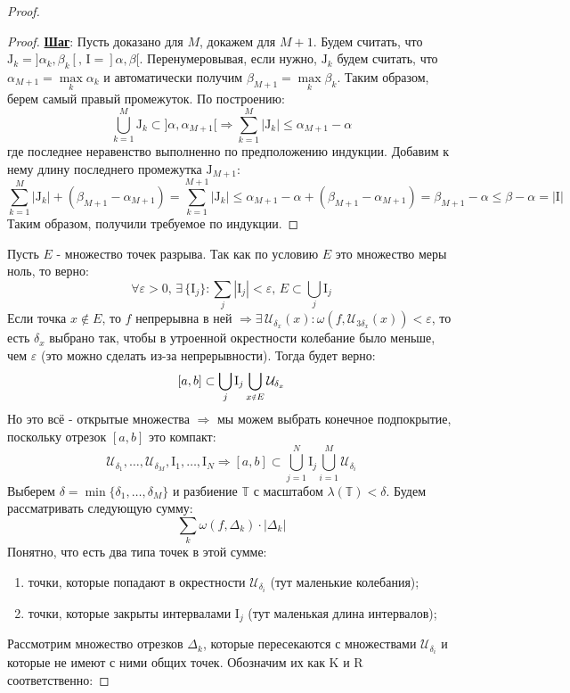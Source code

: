 \documentclass[12pt]{article}
\newcommand{\MTB}{\mathbb{T}}
\newcommand{\MI}{\mathrm{I}}
\newcommand{\MJ}{\mathrm{J}}
\newcommand{\MU}{\mathcal{U}}
\newcommand{\VE}{\varepsilon}
\theoremstyle{definition}
\newcommand{\smallerrel}[1]{\mathrel{\mathpalette\smallerrelaux{#1}}}
\newcommand{\smallerrelaux}[2]{\raisebox{.1ex}{\scalebox{.75}{$#1#2$}}}
\newcommand{\smallnotin}{\smallerrel{\notin}}
\begin{document}
\begin{proof}
\begin{proof}
		\textbf{\uline{Шаг}}: Пусть доказано для $M$, докажем для $M+1$. Будем считать, что $\MJ_k = ]\alpha_k, \beta_k[, \, \MI = ]\alpha,\beta[$. Перенумеровывая, если нужно, $\MJ_k$ будем считать, что $\alpha_{M+1} = \max\limits_{k}\alpha_k$ и автоматически получим $\beta_{M+1} = \max\limits_{k}\beta_k$. Таким образом, берем самый правый промежуток. По построению: 
		$$
			\displaystyle \bigcup\limits_{k = 1}^M \MJ_k \subset ]\alpha, \alpha_{M+1}[ \Rightarrow\sum\limits_{k = 1}^M |\MJ_k| \leq \alpha_{M+1} - \alpha
		$$
		где последнее неравенство выполненно по предположению индукции. Добавим к нему длину последнего промежутка $\MJ_{M+1}$:
		$$
			\sum\limits_{k = 1}^M |\MJ_k| + (\beta_{M+1} - \alpha_{M+1}) = \sum\limits_{k = 1}^{M+1} |\MJ_k| \leq \alpha_{M+1} - \alpha + (\beta_{M+1} - \alpha_{M+1}) = \beta_{M+1} - \alpha \leq \beta - \alpha = |\MI|
		$$
		Таким образом, получили требуемое по индукции.
	\end{proof}
	Пусть $E$ - множество точек разрыва. Так как по условию $E$ это множество меры ноль, то верно:
	$$
		\forall \VE > 0, \, \exists \, \{\MI_j \}\colon \sum\limits_{j}|\MI_j| < \VE, \, E \subset \bigcup\limits_j \MI_j
	$$
	Если точка $x \notin E$, то $f$ непрерывна в ней $\Rightarrow \exists \, \MU_{\delta_x}(x) \colon \omega\left(f,\MU_{3\delta_x}(x)\right) < \VE$, то есть $\delta_x$ выбрано так, чтобы в утроенной окрестности колебание было меньше, чем $\VE$ (это можно сделать из-за непрерывности). Тогда будет верно:
	$$
		[a,b] \subset \bigcup\limits_j \MI_j \bigcup\limits_{x \smallnotin E} \MU_{\delta_x}
	$$
	Но это всё - открытые множества $\Rightarrow$ мы можем выбрать конечное подпокрытие, поскольку отрезок $[a,b]$ это компакт:
	$$
		\MU_{\delta_1}, \dotsc, \MU_{\delta_M}, \MI_1, \dotsc , \MI_N \Rightarrow [a,b] \subset \bigcup\limits_{j = 1}^{N} \MI_j \bigcup\limits_{i = 1}^M \MU_{\delta_i}
	$$
	Выберем $\delta = \min\{\delta_1, \dotsc, \delta_M\}$ и разбиение $\MTB$ с масштабом $\lambda(\MTB) < \delta$. Будем рассматривать следующую сумму:
	$$
		\sum\limits_{k}\omega\left(f, \Delta_k\right){\cdot}|\Delta_k|
	$$
	\newpage
	Понятно, что есть два типа точек в этой сумме: 
	\begin{enumerate}[label={\arabic*)}]
		\item точки, которые попадают в окрестности $\MU_{\delta_i}$ (тут маленькие колебания);
		\item точки, которые закрыты интервалами $\MI_j$ (тут маленькая длина интервалов);
	\end{enumerate}
	Рассмотрим множество отрезков $\Delta_k$, которые пересекаются с множествами $\MU_{\delta_i}$ и которые не имеют с ними общих точек. Обозначим их как $\mathrm{K}$ и $\mathrm{R}$ соответственно:

\end{proof}
\end{document}
